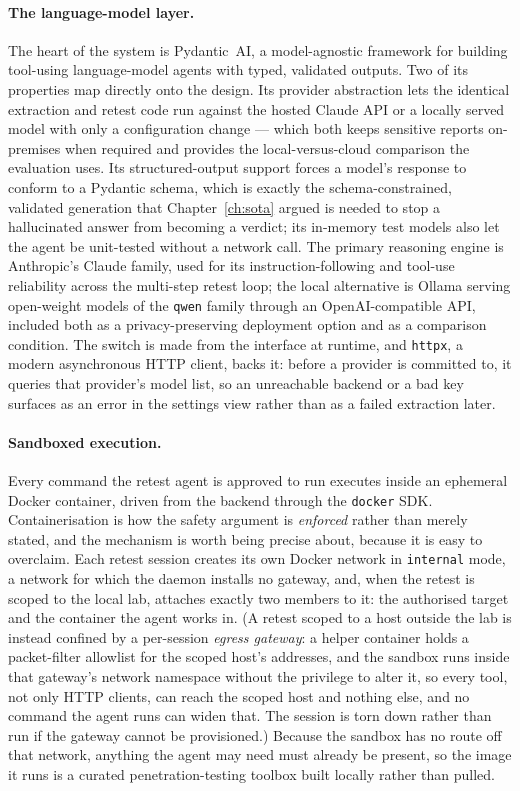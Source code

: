 \paragraph{The language-model layer.} The heart of the system is Pydantic~AI, a
model-agnostic framework for building tool-using language-model agents with typed,
validated outputs. Two of its properties map directly onto the design. Its provider
abstraction lets the identical extraction and retest code run against the hosted
Claude API or a locally served model with only a configuration change --- which both
keeps sensitive reports on-premises when required and provides the local-versus-cloud
comparison the evaluation uses. Its structured-output support forces a model's
response to conform to a Pydantic schema, which is exactly the schema-constrained,
validated generation that Chapter~\ref{ch:sota} argued is needed to stop a
hallucinated answer from becoming a verdict; its in-memory test models also let the
agent be unit-tested without a network call. The primary reasoning engine is
Anthropic's Claude family, used for its instruction-following and tool-use
reliability across the multi-step retest loop; the local alternative is Ollama
serving open-weight models of the \texttt{qwen} family through an OpenAI-compatible
API, included both as a privacy-preserving deployment option and as a comparison
condition. The switch is made from the interface at runtime, and \texttt{httpx}, a
modern asynchronous HTTP client, backs it: before a provider is committed to, it
queries that provider's model list, so an unreachable backend or a bad key surfaces
as an error in the settings view rather than as a failed extraction later.

\paragraph{Sandboxed execution.} Every command the retest agent is approved to run
executes inside an ephemeral Docker container, driven from the backend through the
\texttt{docker} SDK. Containerisation is how the safety argument is \emph{enforced}
rather than merely stated, and the mechanism is worth being precise about, because
it is easy to overclaim. Each retest session creates its own Docker network in
\texttt{internal} mode, a network for which the daemon installs no gateway,
and, when the retest is scoped to the local lab, attaches exactly two members to
it: the authorised target and the container the agent works in. (A retest scoped to
a host outside the lab is instead confined by a per-session \emph{egress gateway}:
a helper container holds a packet-filter allowlist for the scoped host's addresses,
and the sandbox runs inside that gateway's network namespace without the privilege
to alter it, so every tool, not only HTTP clients, can reach the scoped host and
nothing else, and no command the agent runs can widen that. The session is torn
down rather than run if the gateway cannot be provisioned.) Because the sandbox
has no route off that network, anything the agent may need must already be present,
so the image it runs is a curated penetration-testing toolbox built locally rather
than pulled.

